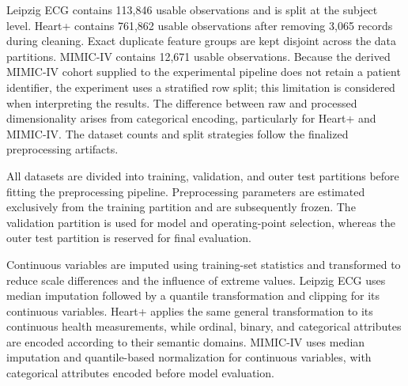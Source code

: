 \documentclass[preprint,12pt]{elsarticle}
\begin{document}
\begin{table}[!ht]
\centering
\caption{Datasets used in the experimental evaluation.}
\label{tab:datasets}
\end{table}

Leipzig ECG contains 113,846 usable observations and is split at the subject
level. Heart+ contains 761,862 usable observations after removing 3,065 records
during cleaning. Exact duplicate feature groups are kept disjoint across the
data partitions. MIMIC-IV contains 12,671 usable observations. Because the derived
MIMIC-IV cohort supplied to the experimental pipeline does not retain a patient
identifier, the experiment uses a stratified row split; this limitation is
considered when interpreting the results. The difference between raw and processed dimensionality arises
from categorical encoding, particularly for Heart+ and MIMIC-IV. The dataset
counts and split strategies follow the finalized preprocessing artifacts.

All datasets are divided into training, validation, and outer test partitions
before fitting the preprocessing pipeline. Preprocessing parameters are
estimated exclusively from the training partition and are subsequently frozen.
The validation partition is used for model and operating-point selection,
whereas the outer test partition is reserved for final evaluation.

Continuous variables are imputed using training-set statistics and transformed
to reduce scale differences and the influence of extreme values. Leipzig ECG
uses median imputation followed by a quantile transformation and clipping for
its continuous variables. Heart+ applies the same general transformation to
its continuous health measurements, while ordinal, binary, and categorical
attributes are encoded according to their semantic domains. MIMIC-IV uses
median imputation and quantile-based normalization for continuous variables,
with categorical attributes encoded before model evaluation.
\end{document}
